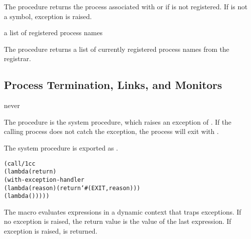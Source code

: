The  procedure returns the process associated with
 or  if  is not registered.  If
 is not a symbol, exception  is raised.

\begin{procedure}
\end{procedure}
\returns{} a list of registered process names

The  procedure returns a list of currently
registered process names from the registrar.

\subsection {Process Termination, Links, and Monitors}

\begin{procedure}
\end{procedure}
\returns{} never

The  procedure is the system  procedure,
which raises an exception of . If the calling process does
not catch the exception, the process will exit with .

The system  procedure is exported as
.

\begin{syntax}
\end{syntax}
\expandsto{}\begin{alltt}\antipar
(call/1cc
 (lambda (return)
   (with-exception-handler
    (lambda (reason) (return `#(EXIT ,reason)))
    (lambda ()   \etc{}))))\end{alltt}

The  macro evaluates expressions  
\etc{} in a dynamic context that traps exceptions.  If no exception is
raised, the return value is the value of the last expression. If
exception  is raised,  is
returned.

